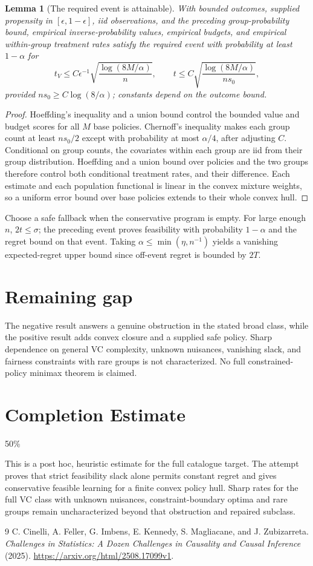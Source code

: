 \documentclass[11pt]{article}
\newtheorem{lemma}[theorem]{Lemma}
\theoremstyle{remark}
\begin{document}
\begin{lemma}[The required event is attainable]
With bounded outcomes, supplied propensity in $[\epsilon,1-\epsilon]$, iid observations, and the preceding group-probability bound, empirical inverse-probability values, empirical budgets, and empirical within-group treatment rates satisfy the required event with probability at least $1-\alpha$ for
\[
 t_V\le C\epsilon^{-1}\sqrt{\frac{\log(8M/\alpha)}n},\qquad
 t\le C\sqrt{\frac{\log(8M/\alpha)}{ns_0}},
\]
provided $ns_0\ge C\log(8/\alpha)$; constants depend on the outcome bound.
\end{lemma}
\begin{proof}
Hoeffding's inequality and a union bound control the bounded value and budget scores for all $M$ base policies. Chernoff's inequality makes each group count at least $ns_0/2$ except with probability at most $\alpha/4$, after adjusting $C$. Conditional on group counts, the covariates within each group are iid from their group distribution. Hoeffding and a union bound over policies and the two groups therefore control both conditional treatment rates, and their difference. Each estimate and each population functional is linear in the convex mixture weights, so a uniform error bound over base policies extends to their whole convex hull.
\end{proof}
Choose a safe fallback when the conservative program is empty. For large enough $n$, $2t\le\sigma$; the preceding event proves feasibility with probability $1-\alpha$ and the regret bound on that event. Taking $\alpha\le\min(\eta,n^{-1})$ yields a vanishing expected-regret upper bound since off-event regret is bounded by $2T$.

\section*{Remaining gap}
The negative result answers a genuine obstruction in the stated broad class, while the positive result adds convex closure and a supplied safe policy. Sharp dependence on general VC complexity, unknown nuisances, vanishing slack, and fairness constraints with rare groups is not characterized. No full constrained-policy minimax theorem is claimed.

\section{Completion Estimate}
50\%

This is a post hoc, heuristic estimate for the full catalogue target.
The attempt proves that strict feasibility slack alone permits constant regret and gives conservative feasible learning for a finite convex policy hull. Sharp rates for the full VC class with unknown nuisances, constraint-boundary optima and rare groups remain uncharacterized beyond that obstruction and repaired subclass.

\begin{thebibliography}{9}
 C. Cinelli, A. Feller, G. Imbens, E. Kennedy, S. Magliacane, and J. Zubizarreta. \emph{Challenges in Statistics: A Dozen Challenges in Causality and Causal Inference} (2025). \url{https://arxiv.org/html/2508.17099v1}.
\end{thebibliography}
\end{document}
